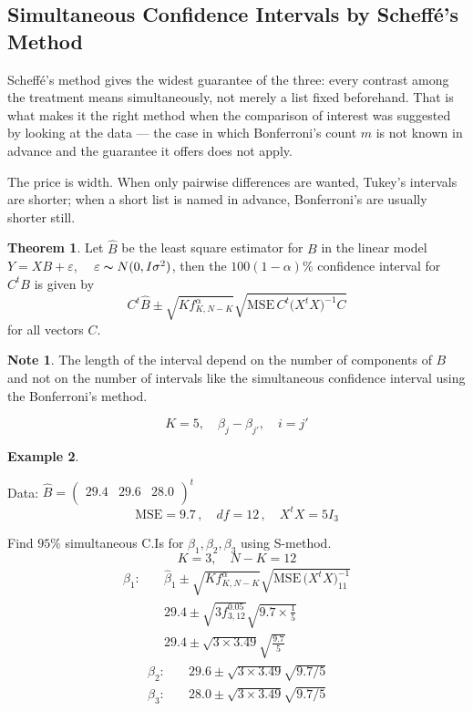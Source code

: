 \documentclass[11pt,a4paper]{article}
\theoremstyle{definition}
\newtheorem{thm}{Theorem}[subsection]
\newtheorem{exa}[thm]{Example}
\newtheorem*{note}{Note}
\begin{document}
\subsection*{Simultaneous Confidence Intervals by Scheff\'e's Method}
Scheff\'e's method gives the widest guarantee of the three: every contrast
among the treatment means simultaneously, not merely a list fixed beforehand.
That is what makes it the right method when the comparison of interest was
suggested by looking at the data --- the case in which Bonferroni's count $m$
is not known in advance and the guarantee it offers does not apply.

The price is width. When only pairwise differences are wanted, Tukey's
intervals are shorter; when a short list is named in advance, Bonferroni's are
usually shorter still.


\begin{thm}\label{res:thm:2.3.5}
Let $\widehat{B}$ be the least square estimator for $B$ in the linear model $Y=XB+\varepsilon$, $\quad  \varepsilon \thicksim N(0,I\sigma^2)$, then the $100(1-\alpha)\%$ confidence interval for $C^tB$ is given by $$C^t\widehat{B}\pm \sqrt{Kf^{\alpha}_{K,N-K}}\sqrt{\text{MSE}\,C^t\big(X^tX\big)^{-1}C}$$ for all vectors $C$.\\


\begin{note}
The length of the interval depend on the number of  components of $B$ and not on the number of intervals like the  simultaneous confidence interval using the Bonferroni's method.
\end{note}
$$K=5,\quad  \beta_j-\beta_{j'},\quad  i=j'$$
\end{thm}


\begin{exa}\label{res:exa:2.3.6}

Data: $\widehat{B}=
\begin{pmatrix}
29.4 & 29.6 & 28.0\\
\end{pmatrix}^t
$
$$\text{MSE} = 9.7\, ,\quad  df=12\, ,\quad  X^tX =5I_3$$

Find $95\%$ simultaneous C.Is for $\beta_1, \beta_2, \beta_3$ using S-method. $$K=3,\quad  N-K=12$$
\begin{align*}
\beta_1:\quad  & \widehat{\beta}_1 \pm \sqrt{Kf^{\alpha}_{K,N-K}}\sqrt{\text{MSE}\,\big(X^tX\big)^{-1}_{11}}\\
         & 29.4 \pm \sqrt{3f^{0.05}_{3,12}}\sqrt{9.7\times \frac{1}{5}}\\
         & 29.4\pm \sqrt{3\times 3.49}\sqrt{\frac{9.7}{5}}
\end{align*}
\begin{align*}
\beta_2:\quad  & 29.6 \pm \sqrt{3\times 3.49}\sqrt{9.7/5}
\end{align*}
\begin{align*}
\beta_3:\quad  & 28.0 \pm \sqrt{3\times 3.49}\sqrt{9.7/5}\\
\end{align*}
\end{exa}
\end{document}
